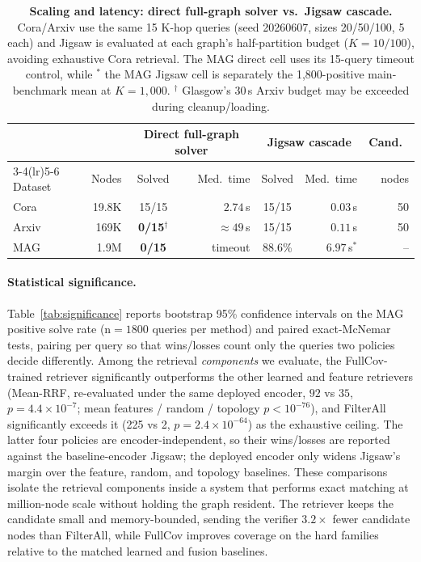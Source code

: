 \documentclass[runningheads]{llncs}
\begin{document}
\begin{table}[t]
\centering
\caption{\textbf{Scaling and latency: direct full-graph solver vs.\ Jigsaw cascade.} Cora/Arxiv use the same 15 K-hop queries (seed 20260607, sizes 20/50/100, 5 each) and Jigsaw is evaluated at each graph's half-partition budget ($K=10/100$), avoiding exhaustive Cora retrieval. The MAG direct cell uses its 15-query timeout control, while $^\ast$ the MAG Jigsaw cell is separately the 1,800-positive main-benchmark mean at $K=1{,}000$. $^\dagger$ Glasgow's 30\,s Arxiv budget may be exceeded during cleanup/loading.}
\label{tab:scaling_latency}
\small
\begin{tabular}{l r c r c r r}
\toprule
 & & \multicolumn{2}{c}{Direct full-graph solver} & \multicolumn{2}{c}{Jigsaw cascade} & Cand.\ \\
\cmidrule(lr){3-4}\cmidrule(lr){5-6}
Dataset & Nodes & Solved & Med.\ time & Solved & Med.\ time & nodes \\
\midrule
Cora  & 19.8K & 15/15 & $2.74$\,s & 15/15 & $\mathbf{0.03}$\,s & 50 \\
Arxiv & 169K  & \textbf{0/15}$^\dagger$ & ${\approx}49$\,s & 15/15 & $\mathbf{0.11}$\,s & 50 \\
MAG   & 1.9M  & \textbf{0/15} & timeout & 88.6\% & $6.97$\,s$^\ast$ & -- \\
\bottomrule
\end{tabular}
\end{table}

\paragraph{Statistical significance.}
Table~\ref{tab:significance} reports bootstrap 95\% confidence intervals on the MAG positive solve rate (n${=}1800$ queries per method) and paired exact-McNemar tests, pairing per query so that wins/losses count only the queries two policies decide differently. Among the retrieval \emph{components} we evaluate, the FullCov-trained retriever significantly outperforms the other learned and feature retrievers (Mean-RRF, re-evaluated under the same deployed encoder, $92$ vs $35$, $p{=}4.4{\times}10^{-7}$; mean features / random / topology $p<10^{-76}$), and FilterAll significantly exceeds it (225 vs 2, $p{=}2.4{\times}10^{-64}$) as the exhaustive ceiling. The latter four policies are encoder-independent, so their wins/losses are reported against the baseline-encoder Jigsaw; the deployed encoder only widens Jigsaw's margin over the feature, random, and topology baselines. These comparisons isolate the retrieval components inside a system that performs exact matching at million-node scale without holding the graph resident. The retriever keeps the candidate small and memory-bounded, sending the verifier $3.2\times$ fewer candidate nodes than FilterAll, while FullCov improves coverage on the hard families relative to the matched learned and fusion baselines.
\end{document}
